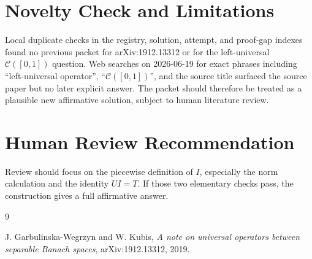 \documentclass[11pt]{article}
\newcommand{\C}{\mathcal C}
\begin{document}
\section*{Novelty Check and Limitations}

Local duplicate checks in the registry, solution, attempt, and proof-gap
indexes found no previous packet for arXiv:1912.13312 or for the
left-universal \(\C([0,1])\) question. Web searches on 2026-06-19 for exact
phrases including ``left-universal operator'', ``\(\C([0,1])\)'', and the
source title surfaced the source paper but no later explicit answer. The
packet should therefore be treated as a plausible new affirmative solution,
subject to human literature review.

\section*{Human Review Recommendation}

Review should focus on the piecewise definition of \(I\), especially the norm
calculation and the identity \(UI=T\). If those two elementary checks pass,
the construction gives a full affirmative answer.

\begin{thebibliography}{9}

J. Garbulinska-Wegrzyn and W. Kubis,
\emph{A note on universal operators between separable Banach spaces},
arXiv:1912.13312, 2019.

\end{thebibliography}
\end{document}
